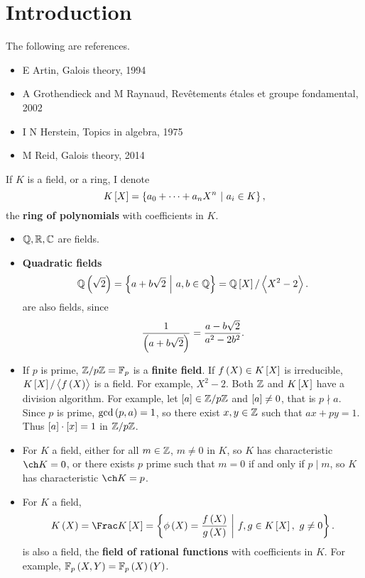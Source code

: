 

\section{Introduction}


The following are references.
\begin{itemize}
\item E Artin, Galois theory, 1994
\item A Grothendieck and M Raynaud, Rev\^etements \'etales et groupe fondamental, 2002
\item I N Herstein, Topics in algebra, 1975
\item M Reid, Galois theory, 2014
\end{itemize}

\begin{notation*}
If $ K $ is a field, or a ring, I denote
$$ K\sbr{X} = \cbr{a_0 + \dots + a_nX^n \st a_i \in K}, $$
the \textbf{ring of polynomials} with coefficients in $ K $.
\end{notation*}

\begin{example*}
\hfill
\begin{itemize}
\item $ \mathbb{Q}, \mathbb{R}, \mathbb{C} $ are fields.
\item \textbf{Quadratic fields}
$$ \QQ\br{\sqrt{2}} = \cbr{a + b\sqrt{2} \st a, b \in \QQ} = \QQ\sbr{X} / \abr{X^2 - 2}. $$
are also fields, since
$$ \dfrac{1}{\br{a + b\sqrt{2}}} = \dfrac{a - b\sqrt{2}}{a^2 - 2b^2}. $$
\item If $ p $ is prime, $ \mathbb{Z} / p\mathbb{Z} = \mathbb{F}_p $ is a \textbf{finite field}. If $ f\br{X} \in K\sbr{X} $ is irreducible, $ K\sbr{X} / \abr{f\br{X}} $ is a field. For example, $ X^2 - 2 $. Both $ \mathbb{Z} $ and $ K\sbr{X} $ have a division algorithm. For example, let $ \sbr{a} \in \ZZ / p\ZZ $ and $ \sbr{a} \ne 0 $, that is $ p \nmid a $. Since $ p $ is prime, $ \gcd\br{p, a} = 1 $, so there exist $ x, y \in \mathbb{Z} $ such that $ ax + py = 1 $. Thus $ \sbr{a} \cdot \sbr{x} = 1 $ in $ \mathbb{Z} / p\mathbb{Z} $.
\item For $ K $ a field, either for all $ m \in \mathbb{Z} $, $ m \ne 0 $ in $ K $, so $ K $ has characteristic $ \ch K = 0 $, or there exists $ p $ prime such that $ m = 0 $ if and only if $ p \mid m $, so $ K $ has characteristic $ \ch K = p $.
\item For $ K $ a field,
$$ K\br{X} = \Frac K\sbr{X} = \cbr{\phi\br{X} = \dfrac{f\br{X}}{g\br{X}} \st f, g \in K\sbr{X}, \ g \ne 0}. $$
is also a field, the \textbf{field of rational functions} with coefficients in $ K $. For example, $ \FF_p\br{X, Y} = \FF_p\br{X}\br{Y} $.
\end{itemize}
\end{example*}

